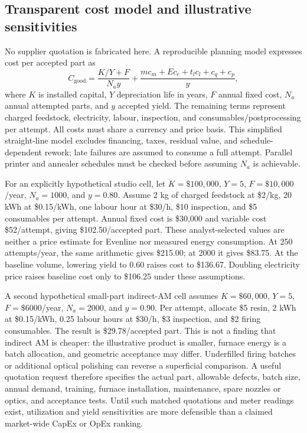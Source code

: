 \subsection{Transparent cost model and illustrative sensitivities}
No supplier quotation is fabricated here. A reproducible planning model expresses cost per accepted part as
\begin{equation}
 C_{\mathrm{good}}=\frac{K/Y+F}{N_a y}
 +\frac{m c_m+E c_e+t_l c_l+c_q+c_p}{y},
\label{eq:commercialcost}
\end{equation}
where $K$ is installed capital, $Y$ depreciation life in years, $F$ annual fixed cost, $N_a$ annual attempted parts, and $y$ accepted yield. The remaining terms represent charged feedstock, electricity, labour, inspection, and consumables/postprocessing per attempt. All costs must share a currency and price basis. This simplified straight-line model excludes financing, taxes, residual value, and schedule-dependent rework; late failures are assumed to consume a full attempt. Parallel printer and annealer schedules must be checked before assuming $N_a$ is achievable.

For an explicitly hypothetical studio cell, let $K=\$100{,}000$, $Y=5$, $F=\$10{,}000$/year, $N_a=1000$, and $y=0.80$. Assume 2 kg of charged feedstock at \$2/kg, 20 kWh at \$0.15/kWh, one labour hour at \$30/h, \$10 inspection, and \$5 consumables per attempt. Annual fixed cost is \$30,000 and variable cost \$52/attempt, giving \$102.50/accepted part. These analyst-selected values are neither a price estimate for Evenline nor measured energy consumption. At 250 attempts/year, the same arithmetic gives \$215.00; at 2000 it gives \$83.75. At the baseline volume, lowering yield to 0.60 raises cost to \$136.67. Doubling electricity price raises baseline cost only to \$106.25 under these assumptions.

A second hypothetical small-part indirect-AM cell assumes $K=\$60{,}000$, $Y=5$, $F=\$6000$/year, $N_a=2000$, and $y=0.90$. Per attempt, allocate \$5 resin, 2 kWh at \$0.15/kWh, 0.25 labour hours at \$30/h, \$3 inspection, and \$2 firing consumables. The result is \$29.78/accepted part. This is not a finding that indirect AM is cheaper: the illustrative product is smaller, furnace energy is a batch allocation, and geometric acceptance may differ. Underfilled firing batches or additional optical polishing can reverse a superficial comparison. A useful quotation request therefore specifies the actual part, allowable defects, batch size, annual demand, training, furnace installation, maintenance, spare nozzles or optics, and acceptance tests. Until such matched quotations and meter readings exist, utilization and yield sensitivities are more defensible than a claimed market-wide CapEx or OpEx ranking.
